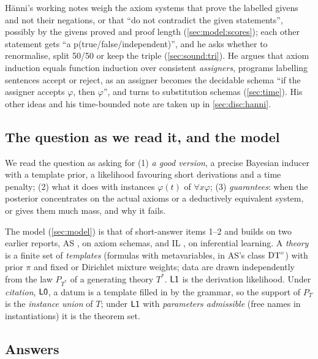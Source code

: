 H\"anni's working notes \citep{hanni2026notes} weigh the axiom systems that prove the labelled givens and not their negations, or that ``do not contradict the given statements'', possibly by the givens proved and proof length (\cref{sec:model:scores}); each other statement gets ``a p(true/false/independent)'', and he asks whether to renormalise, split 50/50 or keep the triple (\cref{sec:sound:tri}). He argues that axiom induction equals function induction over consistent \emph{assigners}, programs labelling sentences accept or reject, as an assigner becomes the decidable schema ``if the assigner accepts $\varphi$, then $\varphi$'', and turns to substitution schemas (\cref{sec:time}). His other ideas and his time-bounded note are taken up in \cref{sec:disc:hanni}.

\subsection{The question as we read it, and the model}\label{sec:intro:reading}

We read the question as asking for (1) \emph{a good version}, a precise Bayesian inducer with a template prior, a likelihood favouring short derivations and a time penalty; (2) what it does with instances $\varphi(t)$ of $\forall x\varphi$; (3) \emph{guarantees}: when the posterior concentrates on the actual axioms or a deductively equivalent system, or gives them much mass, and why it fails.

The model (\cref{sec:model}) is that of short-answer items 1--2 and builds on two earlier reports, AS \citep{claude2026axiomschemas}, on axiom schemas, and IL \citep{claude2026whatfollows}, on inferential learning. A \emph{theory} is a finite set of \emph{templates} (formulas with metavariables, in AS's class $\mathrm{DT}^{\circ}$) with prior $\pi$ and fixed or Dirichlet mixture weights; data are drawn independently from the law $P_{T^*}$ of a generating theory $T^*$. $\mathord{\mathsf{L1}}$ is the derivation likelihood. Under \emph{citation}, $\mathord{\mathsf{L0}}$, a datum is a template filled in by the grammar, so the support of $P_T$ is the \emph{instance union} of $T$; under $\mathord{\mathsf{L1}}$ with \emph{parameters admissible} (free names in instantiations) it is the theorem set.

\subsection{Answers}\label{sec:intro:answers}

